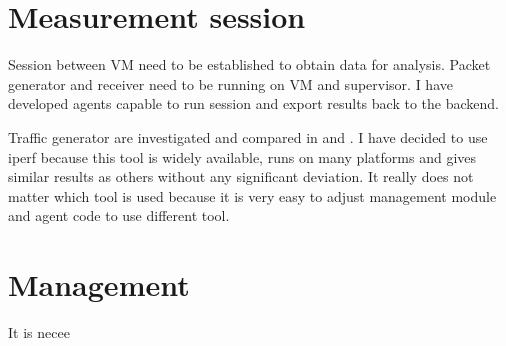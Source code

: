 \section{Measurement session}
Session between \Ac{VM} need to be established to obtain data for analysis. Packet generator and receiver need to be running on \Ac{VM} and supervisor. I have developed agents capable to run session and export results back to the backend.

Traffic generator are investigated and compared in \cite{traffic-generators1} and \cite{traffic-generators2}. I have decided to use iperf because this tool is widely available, runs on many platforms and gives similar results as others without any significant deviation. It really does not matter which tool is used because it is very easy to adjust management module and agent code to use different tool.

\section{Management}
It is necee
